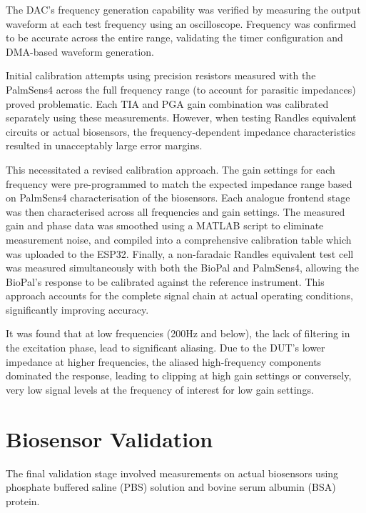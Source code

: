 The DAC's frequency generation capability was verified by measuring the output waveform at each test frequency using an oscilloscope. Frequency was confirmed to be accurate across the entire range, validating the timer configuration and DMA-based waveform generation. 

Initial calibration attempts using precision resistors measured with the PalmSens4 across the full frequency range (to account for parasitic impedances) proved problematic. Each TIA and PGA gain combination was calibrated separately using these measurements. However, when testing Randles equivalent circuits or actual biosensors, the frequency-dependent impedance characteristics resulted in unacceptably large error margins. 

This necessitated a revised calibration approach. The gain settings for each frequency were pre-programmed to match the expected impedance range based on PalmSens4 characterisation of the biosensors. Each analogue frontend stage was then characterised across all frequencies and gain settings. The measured gain and phase data was smoothed using a MATLAB script to eliminate measurement noise, and compiled into a comprehensive calibration table which was uploaded to the ESP32. Finally, a non-faradaic Randles equivalent test cell was measured simultaneously with both the BioPal and PalmSens4, allowing the BioPal's response to be calibrated against the reference instrument. This approach accounts for the complete signal chain at actual operating conditions, significantly improving accuracy.

It was found that at low frequencies (200Hz and below), the lack of filtering in the excitation phase, lead to significant aliasing. Due to the \ac{DUT}'s lower impedance at higher frequencies, the aliased high-frequency components dominated the response, leading to clipping at high gain settings or conversely, very low signal levels at the frequency of interest for low gain settings.

\section{Biosensor Validation}

The final validation stage involved measurements on actual biosensors using phosphate buffered saline (PBS) solution and bovine serum albumin (BSA) protein. 


